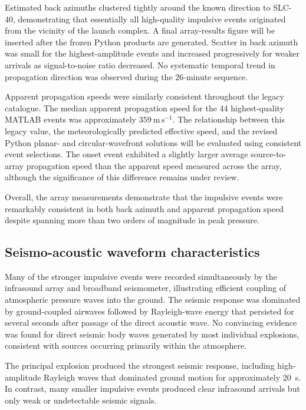 \documentclass[]{seismica}
\begin{document}
Estimated back azimuths clustered tightly around the known direction to SLC-40, demonstrating that essentially all high-quality impulsive events originated from the vicinity of the launch complex. A final array-results figure will be inserted after the frozen Python products are generated. Scatter in back azimuth was small for the highest-amplitude events and increased progressively for weaker arrivals as signal-to-noise ratio decreased. No systematic temporal trend in propagation direction was observed during the 26-minute sequence.

Apparent propagation speeds were similarly consistent throughout the legacy catalogue. The median apparent propagation speed for the 44 highest-quality MATLAB events was approximately $359~\mathrm{m\,s^{-1}}$. The relationship between this legacy value, the meteorologically predicted effective speed, and the revised Python planar- and circular-wavefront solutions will be evaluated using consistent event selections. The onset event exhibited a slightly larger average source-to-array propagation speed than the apparent speed measured across the array, although the significance of this difference remains under review.

Overall, the array measurements demonstrate that the impulsive events were remarkably consistent in both back azimuth and apparent propagation speed despite spanning more than two orders of magnitude in peak pressure.

\subsection{Seismo-acoustic waveform characteristics}
\label{sec:results_waveforms}

Many of the stronger impulsive events were recorded simultaneously by the
infrasound array and broadband seismometer, illustrating efficient coupling of
atmospheric pressure waves into the ground. The seismic response was dominated by ground-coupled airwaves followed by Rayleigh-wave energy that persisted for several seconds after passage of the direct acoustic wave. No convincing evidence was found for direct seismic body waves generated by most individual explosions, consistent with sources occurring primarily within the atmosphere.

The principal explosion produced the strongest seismic response, including high-amplitude Rayleigh waves that dominated ground motion for approximately 20~s. In contrast, many smaller impulsive events produced clear infrasound arrivals but only weak or undetectable seismic signals.
\end{document}
